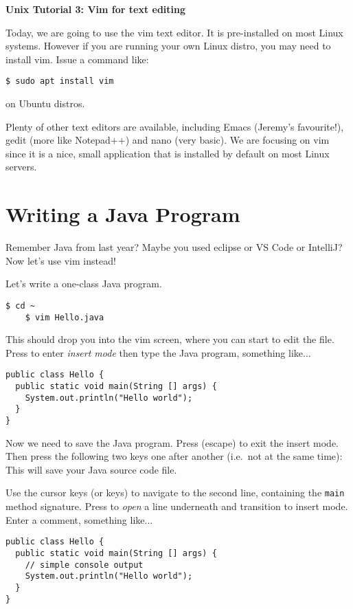 \documentclass{article}
\begin{document}
\noindent
{\Large \textsf{\textbf{Unix Tutorial 3: Vim for text editing}}}

\bigskip


Today, we are going to use the vim text editor. It is pre-installed on most Linux systems. However if you are running your own Linux distro, you may need to install vim. Issue a command like:
\begin{lstlisting}[style=BashInputStyle]
    $ sudo apt install vim
\end{lstlisting}
on Ubuntu distros.

Plenty of other text editors are available, including Emacs (Jeremy's favourite!), gedit (more like Notepad++) and nano (very basic). We are focusing on vim since it is a nice, small application that is installed by default on most Linux servers.

\section*{Writing a Java Program}

Remember Java from last year? Maybe you used eclipse or VS Code or IntelliJ? Now let's use vim instead!

Let's write a one-class Java program. 

\begin{lstlisting}[style=BashInputStyle]
    $ cd ~
    $ vim Hello.java
\end{lstlisting}

This should drop you into the vim screen, where you can start to edit the file. Press  to enter \textit{insert mode} then type the Java program, something like...

\begin{lstlisting}[style=JavaProg]
public class Hello {
  public static void main(String [] args) {
    System.out.println("Hello world");
  }
}
\end{lstlisting}

Now we need to save the Java program. Press \keys{\esc} (escape) to exit the insert mode. Then press the following two keys one after another (i.e.\ not at the same time): \keys{:}  \keys{\enter}
This will save your Java source code file.

Use the cursor keys (or     keys) to navigate to the second line, containing the \texttt{main} method signature. Press  to \textit{open} a line underneath and transition to insert mode. Enter a comment, something like...
\begin{lstlisting}[style=JavaProg]
public class Hello {
  public static void main(String [] args) {
    // simple console output
    System.out.println("Hello world");
  }
}
\end{lstlisting}
\end{document}

